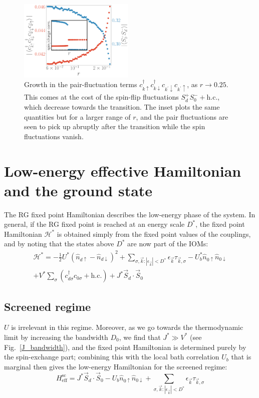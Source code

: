 \documentclass[reprint,superscriptaddress,floatfix]{revtex4-2}
\begin{document}
\begin{figure}[htpb]
	\centering
	\includegraphics[width=0.49\textwidth]{odlro.pdf}
	\caption{Growth in the pair-fluctuation terms \(c^\dagger_{k \uparrow}c^\dagger_{k \downarrow} c_{k^\prime \downarrow}c_{k^\prime \uparrow}\), as \(r \to 0.25\). This comes at the cost of the spin-flip fluctuations \(S_d^+ S_0^- + \text{h.c.}\), which decrease towards the transition. The inset plots the same quantities but for a larger range of \(r\), and the pair fluctuations are seen to pick up abruptly after the transition while the spin fluctuations vanish.}
	\label{pair_fluc}
\end{figure}



\section{Low-energy effective Hamiltonian and the ground state}

The RG fixed point Hamiltonian describes the low-energy phase of the system. In general, if the RG fixed point is reached at an energy scale \(D^*\), the fixed point Hamiltonian \(\mathcal{H}^*\) is obtained simply from the fixed point values of the couplings, and by noting that the states above \(D^*\) are now part of the IOMs:
\begin{equation}\begin{aligned}
	\mathcal{H}^* = -\frac{1}{2}U^*\left(\hat n_{d \uparrow} - \hat n_{d \downarrow}\right)^2 + \sum_{\sigma,\vec k:|\epsilon_{\vec k}| < D^*} \epsilon_{\vec k} \tau_{\vec k,\sigma} - U_b^* \hat n_{0 \uparrow} \hat n_{0 \downarrow} \\
	+ V^*\sum_\sigma \left( c^\dagger_{d\sigma}c_{0\sigma} + \text{h.c.}\right) + J^* \vec{S}_d\cdot\vec{S}_0
\end{aligned}\end{equation}

\subsection{Screened regime}
\(U\) is irrelevant in this regime. Moreover, as we go towards the thermodynamic limit by increasing the bandwidth \(D_0\), we find that \(J^* \gg V^*\) (see Fig.~\ref{J_bandwidth}), and the fixed point Hamiltonian is determined purely by the spin-exchange part; combining this with the local bath correlation \(U_b\) that is marginal then gives the low-energy Hamiltonian for the screened regime:
\begin{equation}
	H_\text{eff}^\text{sc} = J^* \vec{S}_d\cdot\vec{S}_0 - U_b \hat n_{0 \uparrow} \hat n_{0 \downarrow} + \sum_{\sigma,\vec k:|\epsilon_{\vec k}| < D^*} \epsilon_{\vec k} \tau_{\vec k,\sigma}
\end{equation}
\end{document}
